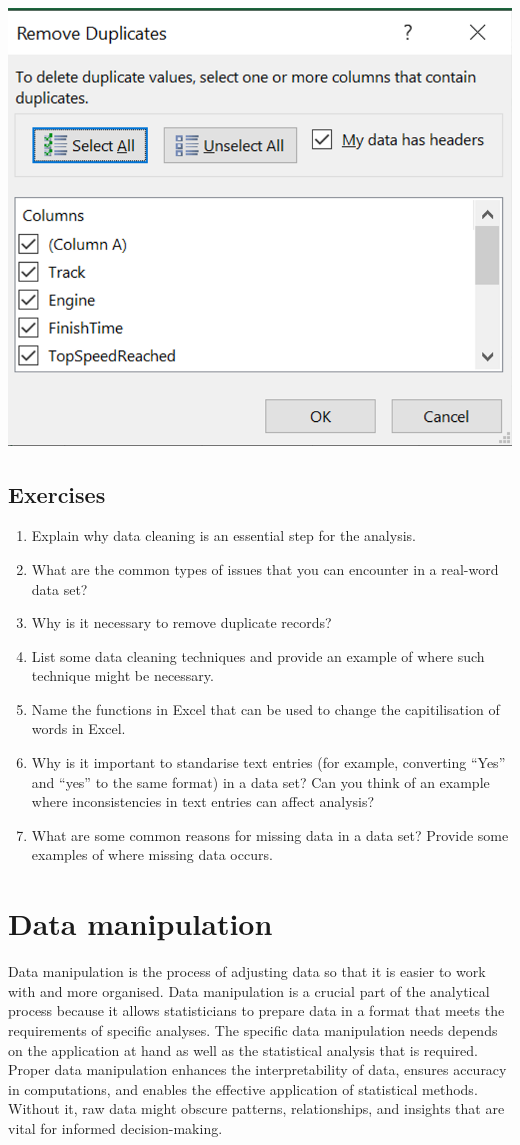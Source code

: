 \documentclass[
]{book}
\begin{document}
\begin{center}\includegraphics[width=0.4\linewidth]{Figures/duplicated_2} \end{center}

\subsection{Exercises}\label{exercises}

\begin{enumerate}
\def\labelenumi{\arabic{enumi}.}
\item
  Explain why data cleaning is an essential step for the analysis.
\item
  What are the common types of issues that you can encounter in a real-word data set?
\item
  Why is it necessary to remove duplicate records?
\item
  List some data cleaning techniques and provide an example of where such technique might be necessary.
\item
  Name the functions in Excel that can be used to change the capitilisation of words in Excel.
\item
  Why is it important to standarise text entries (for example, converting ``Yes'' and ``yes'' to the same format) in a data set? Can you think of an example where inconsistencies in text entries can affect analysis?
\item
  What are some common reasons for missing data in a data set? Provide some examples of where missing data occurs.
\end{enumerate}

\section{Data manipulation}\label{data-manipulation}

Data manipulation is the process of adjusting data so that it is easier to work with and more organised. Data manipulation is a crucial part of the analytical process because it allows statisticians to prepare data in a format that meets the requirements of specific analyses. The specific data manipulation needs depends on the application at hand as well as the statistical analysis that is required. Proper data manipulation enhances the interpretability of data, ensures accuracy in computations, and enables the effective application of statistical methods. Without it, raw data might obscure patterns, relationships, and insights that are vital for informed decision-making.
\end{document}
